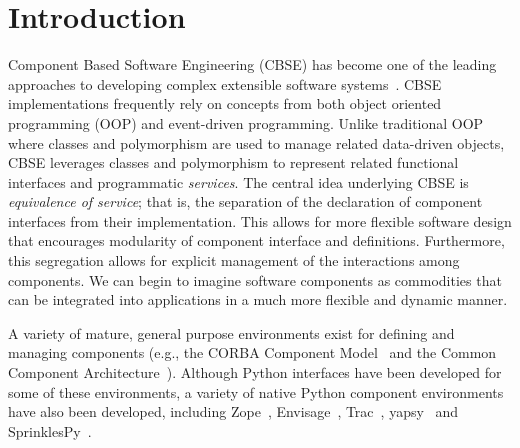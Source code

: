 
\section{Introduction}

Component Based Software Engineering (CBSE) has become one of the leading
approaches to developing complex extensible software
systems~\cite{HeiCou01}.  
CBSE implementations frequently rely on concepts from both object
oriented programming (OOP) and event-driven programming.  Unlike
traditional OOP where classes and polymorphism are used to manage 
related data-driven objects, CBSE leverages classes and
polymorphism to represent related functional interfaces and programmatic
\emph{services}.  
The central idea underlying CBSE is \emph{equivalence of service}; that
is, the separation of the declaration of component
interfaces from their implementation.  This allows for more flexible software
design that encourages modularity of
component interface and definitions.  Furthermore, this segregation
allows for explicit management of the interactions among components.
We can begin to imagine software components as commodities that
can be integrated into applications in a much more flexible and dynamic manner.

A variety of mature, general purpose environments exist
for defining and managing components (e.g., the CORBA Component
Model~\cite{CORBA_CMS} and the Common Component
Architecture~\cite{cca}).  Although 
Python interfaces have been developed for some of these environments, a
variety of native Python component environments have also been developed,
including Zope~\cite{Zope}, Envisage~\cite{Envisage}, Trac~\cite{Trac},
yapsy~\cite{yapsy} and SprinklesPy~\cite{SprinklesPy}.

